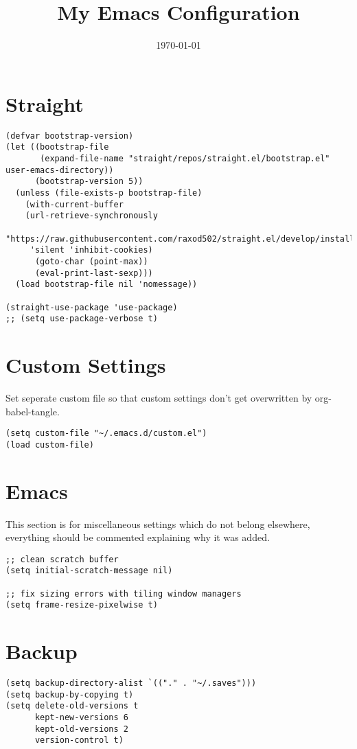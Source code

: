 \documentclass[11pt]{article}
\date{\today}
\title{My Emacs Configuration}
\begin{document}
\maketitle
\tableofcontents


\section{Straight}
\label{sec:orgf58daed}
\begin{verbatim}
(defvar bootstrap-version)
(let ((bootstrap-file
       (expand-file-name "straight/repos/straight.el/bootstrap.el" user-emacs-directory))
      (bootstrap-version 5))
  (unless (file-exists-p bootstrap-file)
    (with-current-buffer
	(url-retrieve-synchronously
	 "https://raw.githubusercontent.com/raxod502/straight.el/develop/install.el"
	 'silent 'inhibit-cookies)
      (goto-char (point-max))
      (eval-print-last-sexp)))
  (load bootstrap-file nil 'nomessage))

(straight-use-package 'use-package)
;; (setq use-package-verbose t)
\end{verbatim}

\section{Custom Settings}
\label{sec:orgbd72953}
Set seperate custom file so that custom settings don't get overwritten by org-babel-tangle.
\begin{verbatim}
(setq custom-file "~/.emacs.d/custom.el")
(load custom-file)
\end{verbatim}

\section{Emacs}
\label{sec:orgedc8043}
This section is for miscellaneous settings which do not belong elsewhere, everything should be commented explaining why it was added.
\begin{verbatim}
;; clean scratch buffer
(setq initial-scratch-message nil)

;; fix sizing errors with tiling window managers
(setq frame-resize-pixelwise t)
\end{verbatim}

\section{Backup}
\label{sec:orgd758558}
\begin{verbatim}
(setq backup-directory-alist `(("." . "~/.saves")))
(setq backup-by-copying t)
(setq delete-old-versions t
      kept-new-versions 6
      kept-old-versions 2
      version-control t)
\end{verbatim}
\end{document}

